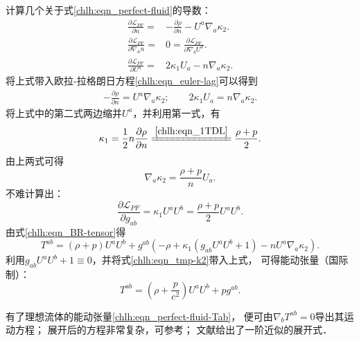 计算几个关于式\eqref{chlh:eqn_perfect-fluid}的导数：
\begin{align}
    \frac{\partial \mathscr{L}_{PF}}{\partial n} = &
    -\frac{\partial\rho }{\partial n} - U^a \nabla_a\kappa_2 .\\
    \frac{\partial \mathscr{L}_{PF}}{\partial \nabla_a n} = &
    0 = \frac{\partial \mathscr{L}_{PF}}{\partial \nabla_b U^a} . \\
    \frac{\partial \mathscr{L}_{PF}}{\partial U^a} = &
    2\kappa_1 U_a - n \nabla_a \kappa_2 .
\end{align}
将上式带入欧拉-拉格朗日方程\eqref{chlh:eqn_euler-lag}可以得到
\begin{align}
    -\frac{\partial\rho }{\partial n}  = U^a \nabla_a\kappa_2; \qquad
    2\kappa_1 U_a = n \nabla_a \kappa_2 .
\end{align}
将上式中的第二式两边缩并$U^a$，并利用第一式，有
\begin{equation}\label{chlh:eqn_tmp-k1}
    \kappa_1 = \frac{1}{2}n \frac{\partial\rho }{\partial n}
    \xlongequal{\ref{chlh:eqn_1TDL}} \frac{\rho+p}{2} .
\end{equation}
由上两式可得
\begin{equation}\label{chlh:eqn_tmp-k2}
    \nabla_a \kappa_2 = \frac{\rho+p}{n} U_a . 
\end{equation}
不难计算出：
\begin{equation}
    \frac{\partial \mathscr{L}_{PF}}{\partial g_{ab}} = 
    \kappa_1 U^a U^b = \frac{\rho+p}{2} U^a U^b .
\end{equation}
由式\eqref{chlh:eqn_BR-tensor}得
\begin{equation*}
    T^{ab}  %
    =(\rho + p)U^a U^b + g^{ab} \left( -\rho
    +\kappa_1\left(g_{ab}U^a U^b+1 \right) 
    -n U^a \nabla_a\kappa_2 \right) .
\end{equation*}
利用$g_{ab}U^a U^b+1\equiv 0$，并将式\eqref{chlh:eqn_tmp-k2}带入上式，
可得能动张量（国际制）：
\begin{equation}\label{chlh:eqn_perfect-fluid-Tab}
    T^{ab}=\left(\rho  + \frac{p}{c^2}  \right) U^a U^b +p g^{ab} .
\end{equation}

有了理想流体的能动张量\eqref{chlh:eqn_perfect-fluid-Tab}，
便可由$\nabla_b T^{ab}=0$导出其运动方程；
展开后的方程非常复杂，可参考\parencite{nelson-1981}；
文献\parencite[\S 39.11]{mtw1973}给出了一阶近似的展开式．



